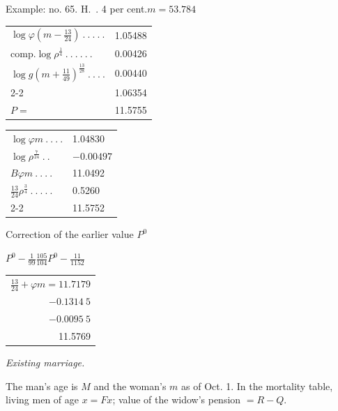 Example: no. 65. H.\ . 4 per cent.\quad \(m=53.784\)
\begin{center}
\fontsize{8}{13}\selectfont\setlength{\tabcolsep}{2pt}
\begin{tabular}{ll}
\(\log\varphi(m-\tfrac{13}{24})\ .\ .\ .\ .\ .\)&1.05488\\
\(\text{comp.}\log\rho^{\frac{1}{4}}\ .\ .\ .\ .\ .\ .\)&0.00426\\
\(\log g(m+\tfrac{11}{49})^{\frac{13}{28}}\ .\ .\ .\ .\)&0.00440\\\cline{2-2}
&1.06354\\
\(P=\)&11.5755
\end{tabular}\qquad
\begin{tabular}{ll}
\(\log\varphi m\ .\ .\ .\ .\)&1.04830\\
\(\log\rho^{\frac{7}{24}}\ .\ .\)&\(-0.00497\)\\
\(B\varphi m\ .\ .\ .\ .\)&11.0492\\
\(\tfrac{13}{24}\rho^{\frac{3}{4}}\ .\ .\ .\ .\ .\)&0.5260\\\cline{2-2}
&11.5752
\end{tabular}\par\medskip
Correction of the earlier value \(P^0\)\par\smallskip
\(P^0-\tfrac{1}{99}\tfrac{105}{104}P^0-\tfrac{11}{1152}\)\par\smallskip
\begin{tabular}{r}
\(\tfrac{13}{24}+\varphi m=11.7179\)\\
\(-0.1314\ 5\)\\
\(-0.0095\ 5\)\\\hline
11.5769
\end{tabular}
\end{center}

\begin{center}\textit{Existing marriage.}\end{center}
\noindent\hspace*{1.2em} The man's age is \(M\) and the woman's \(m\) as of Oct. 1. In the mortality table, living men of age \(x=Fx\); value of the widow's pension \(=R-Q\).

